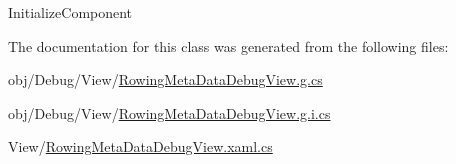 Initialize\+Component 



The documentation for this class was generated from the following files\+:\begin{DoxyCompactItemize}
\item 
obj/\+Debug/\+View/\hyperlink{_debug_2_view_2_rowing_meta_data_debug_view_8g_8cs}{Rowing\+Meta\+Data\+Debug\+View.\+g.\+cs}\item 
obj/\+Debug/\+View/\hyperlink{_debug_2_view_2_rowing_meta_data_debug_view_8g_8i_8cs}{Rowing\+Meta\+Data\+Debug\+View.\+g.\+i.\+cs}\item 
View/\hyperlink{_rowing_meta_data_debug_view_8xaml_8cs}{Rowing\+Meta\+Data\+Debug\+View.\+xaml.\+cs}\end{DoxyCompactItemize}
